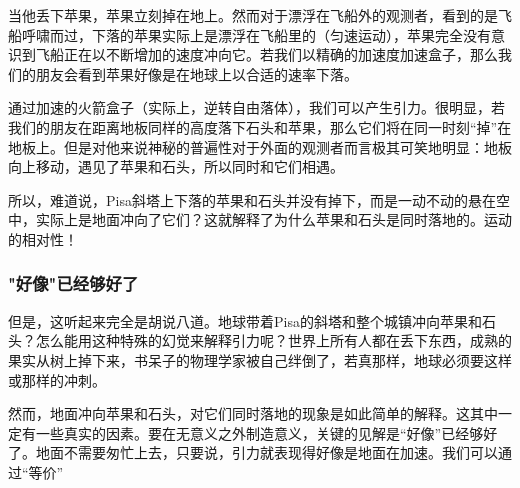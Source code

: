 当他丢下苹果，苹果立刻掉在地上。然而对于漂浮在飞船外的观测者，看到的是飞船呼啸而过，下落的苹果实际上是漂浮在飞船里的（匀速运动），苹果完全没有意识到飞船正在以不断增加的速度冲向它。若我们以精确的加速度加速盒子，那么我们的朋友会看到苹果好像是在地球上以合适的速率下落。

通过加速的火箭盒子（实际上，逆转自由落体），我们可以产生引力。很明显，若我们的朋友在距离地板同样的高度落下石头和苹果，那么它们将在同一时刻“掉”在地板上。但是对他来说神秘的普遍性对于外面的观测者而言极其可笑地明显：地板向上移动，遇见了苹果和石头，所以同时和它们相遇。

所以，难道说，Pisa斜塔上下落的苹果和石头并没有掉下，而是一动不动的悬在空中，实际上是地面冲向了它们？这就解释了为什么苹果和石头是同时落地的。运动的相对性！

\subsubsection{"好像"已经够好了}
但是，这听起来完全是胡说八道。地球带着Pisa的斜塔和整个城镇冲向苹果和石头？怎么能用这种特殊的幻觉来解释引力呢？世界上所有人都在丢下东西，成熟的果实从树上掉下来，书呆子的物理学家被自己绊倒了，若真那样，地球必须要这样或那样的冲刺。

然而，地面冲向苹果和石头，对它们同时落地的现象是如此简单的解释。这其中一定有一些真实的因素。要在无意义之外制造意义，关键的见解是“好像”已经够好了。地面不需要匆忙上去，只要说，引力就表现得好像是地面在加速。我们可以通过“等价”







